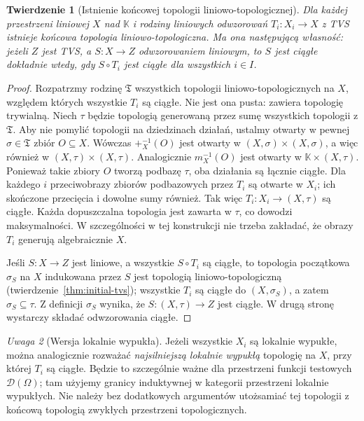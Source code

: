 \documentclass[11pt,a4paper]{article}
\numberwithin{equation}{section}
\theoremstyle{plain}
\newtheorem{twierdzenie}{Twierdzenie}[section]
\theoremstyle{definition}
\theoremstyle{remark}
\newtheorem{uwaga}[twierdzenie]{Uwaga}
\newcommand{\K}{\mathbb K}
\begin{document}
\begin{twierdzenie}[Istnienie końcowej topologii liniowo-topologicznej]
\label{thm:final-tvs}
Dla każdej przestrzeni liniowej $X$ nad $\K$ i rodziny
liniowych odwzorowań $T_i:X_i\to X$ z TVS istnieje
końcowa topologia liniowo-topologiczna. Ma ona następującą
własność: jeżeli $Z$ jest TVS, a $S:X\to Z$ odwzorowaniem
liniowym, to $S$ jest ciągłe dokładnie wtedy, gdy
$S\circ T_i$ jest ciągłe dla wszystkich $i\in I$.
\end{twierdzenie}
\begin{proof}
Rozpatrzmy rodzinę $\mathfrak T$ wszystkich topologii
liniowo-topologicznych na $X$, względem których wszystkie
$T_i$ są ciągłe. Nie jest ona pusta: zawiera topologię
trywialną. Niech $\tau$ będzie topologią generowaną
przez sumę wszystkich topologii z $\mathfrak T$.
Aby nie pomylić topologii na dziedzinach działań,
ustalmy otwarty w pewnej $\sigma\in\mathfrak T$ zbiór
$O\subseteq X$. Wówczas
$+_X^{-1}(O)$ jest otwarty w $(X,\sigma)\times(X,\sigma)$,
a więc również w $(X,\tau)\times(X,\tau)$.
Analogicznie $m_X^{-1}(O)$ jest otwarty w
$\K\times(X,\tau)$. Ponieważ takie zbiory $O$
tworzą podbazę $\tau$, oba działania są łącznie ciągłe.
Dla każdego $i$ przeciwobrazy zbiorów podbazowych przez
$T_i$ są otwarte w $X_i$; ich skończone przecięcia
i dowolne sumy również. Tak więc $T_i:X_i\to(X,\tau)$
są ciągłe. Każda dopuszczalna topologia jest zawarta
w $\tau$, co dowodzi maksymalności. W szczególności
w tej konstrukcji nie trzeba zakładać, że obrazy $T_i$
generują algebraicznie $X$.

Jeśli $S:X\to Z$ jest liniowe, a wszystkie $S\circ T_i$
są ciągłe, to topologia początkowa $\sigma_S$ na $X$
indukowana przez $S$ jest topologią liniowo-topologiczną
(twierdzenie~\ref{thm:initial-tvs}); wszystkie $T_i$
są ciągłe do $(X,\sigma_S)$, a zatem $\sigma_S\subseteq\tau$.
Z definicji $\sigma_S$ wynika, że $S:(X,\tau)\to Z$
jest ciągłe. W drugą stronę wystarczy składać odwzorowania
ciągłe.
\end{proof}

\begin{uwaga}[Wersja lokalnie wypukła]
Jeżeli wszystkie $X_i$ są lokalnie wypukłe, można
analogicznie rozważać \emph{najsilniejszą lokalnie wypukłą}
topologię na $X$, przy której $T_i$ są ciągłe.
Będzie to szczególnie ważne dla przestrzeni funkcji
testowych $\mathcal D(\Omega)$; tam użyjemy granicy
induktywnej w kategorii przestrzeni lokalnie wypukłych.
Nie należy bez dodatkowych argumentów utożsamiać
tej topologii z końcową topologią zwykłych przestrzeni
topologicznych.
\end{uwaga}
\end{document}
